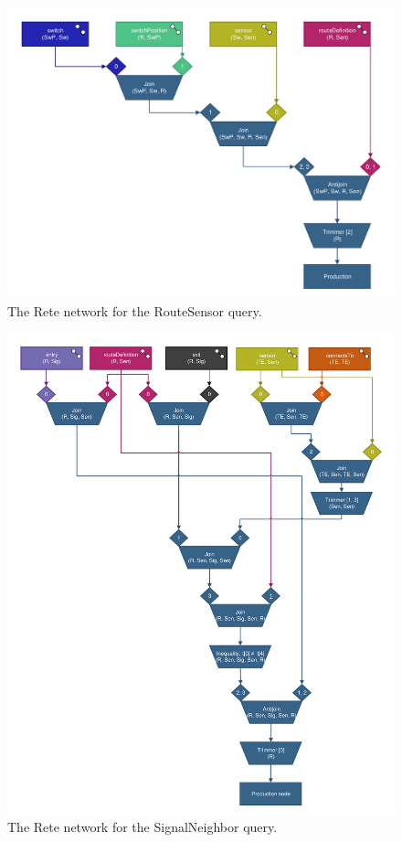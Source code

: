 \begin{figure}[htb]
\begin{center}
\includegraphics[scale=0.5]{figures/rete-routesensor-layout.pdf}
\caption{The Rete network for the \textsf{RouteSensor} query.}
\label{fig:rete-routesensor-layout}
\end{center}
\end{figure}

\begin{figure}[htb]
\begin{center}
\includegraphics[scale=0.5]{figures/rete-signalneighbor-layout.pdf}
\caption{The Rete network for the \textsf{SignalNeighbor} query.}
\label{fig:rete-signalneighbor-layout}
\end{center}
\end{figure}
